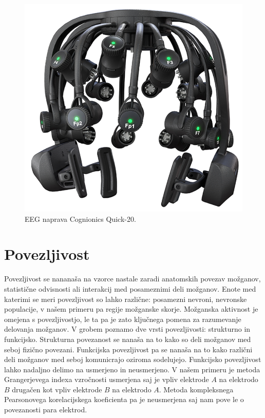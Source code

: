 \begin{figure}[h!]
    \begin{center}
    \includegraphics[width=0.5\linewidth]{slike/Cognionics Quick-20.png}
    \end{center}
    \caption{EEG naprava Cognionics Quick-20.}
    \end{figure}

\section{Povezljivost}
Povezljivost se nananaša na vzorce nastale zaradi anatomskih povezav možganov, statistične odvisnosti ali interakcij med posameznimi deli možganov.  Enote med katerimi se meri povezljivost so lahko različne: posamezni nevroni, nevronske populacije, v našem primeru pa regije možganske skorje. Možganska aktivnost je omejena s povezljivostjo, le ta pa je zato ključnega pomena za razumevanje delovanja možganov. V grobem poznamo dve vrsti povezljivosti: strukturno in funkcijsko. Strukturna povezanost se nanaša na to kako so deli možganov med seboj fizično povezani. Funkcijska povezljivost pa se nanaša na to kako različni deli možganov med seboj komunicrajo oziroma sodelujejo.\cite{sporns_brain_2007} Funkcijsko povezljivost lahko nadaljno delimo na usmerjeno in neusmerjeno. V našem primeru je metoda Grangerjevega indexa vzročnosti usmerjena saj je vpliv elektrode $A$ na elektrodo $B$ drugačen kot vpliv elektrode $B$ na elektrodo $A$. Metoda kompleksnega Pearsonovega korelacijskega koeficienta pa je neusmerjena saj nam pove le o povezanosti para elektrod.
